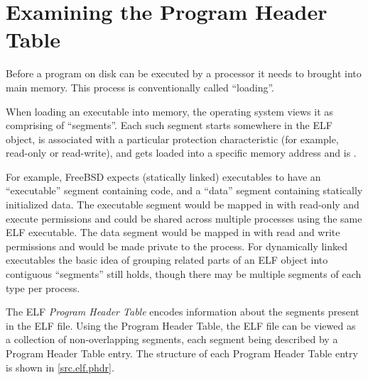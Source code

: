 \documentclass[a4paper]{report}
\newcommand{\firstterm}[1]{\textit{#1}}                 %
\begin{document}
\chapter{Examining the Program Header Table}\label{chap.elf-phdr}
Before a program on disk can be executed by a processor it needs to
brought into main memory.  This process is conventionally called
``loading''.

When loading an executable into memory, the operating system views it
as comprising of ``segments''.  Each such segment starts somewhere in
the ELF object, is associated with a particular protection
characteristic (for example, read-only or read-write), and gets loaded
into a specific memory address and is .

For example, FreeBSD expects (statically linked) executables to have
an ``executable'' segment containing code, and a ``data'' segment
containing statically initialized data.  The executable segment would
be mapped in with read-only and execute permissions and could be
shared across multiple processes using the same ELF executable.  The
data segment would be mapped in with read and write permissions and
would be made private to the process.  For dynamically linked
executables the basic idea of grouping related parts of an ELF object
into contiguous ``segments'' still holds, though there may be multiple
segments of each type per process.

The ELF \firstterm{Program Header Table} encodes information about the
segments present in the ELF file.  Using the Program Header Table, the
ELF file can be viewed as a collection of non-overlapping segments,
each segment being described by a Program Header Table entry.  The
structure of each Program Header Table entry is shown in \vref{src.elf.phdr}.
\end{document}
